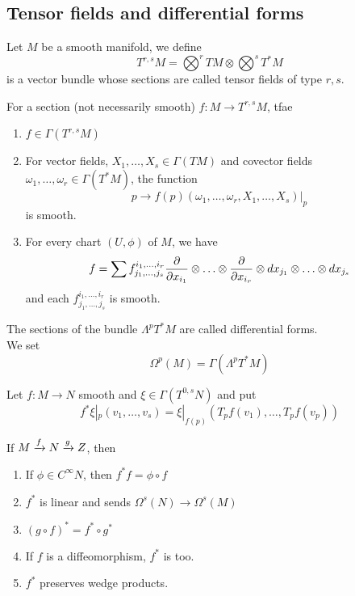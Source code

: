 \documentclass[../main.tex]{subfiles}
\begin{document}
\subsection{Tensor fields and differential forms}
\begin{defn}
	Let $M$ be a smooth manifold, we define
	\[ 
	T^{r,s}M = \bigotimes^{r}TM \otimes \bigotimes^{s}T^{\ast}M
	\]
	is a vector bundle whose sections are called tensor fields of type $r,s$.
\end{defn}
\begin{propo}
For a section (not necessarily smooth)  $f:M\to T^{r,s}M$, tfae
\begin{enumerate}
\item $f\in \Gamma( T^{r,s}M) $ 
\item For vector fields, $X_{1},\ldots, X_s \in \Gamma( TM) $ and covector fields $\omega_1,\ldots,\omega_r\in \Gamma( T^{\ast}M) $, the function
	\[ 
	p \to f( p) ( \omega_1,\ldots,\omega_r, X_1,\ldots,X_s)|_p
	\]
	is smooth.

\item For every chart $( U,\phi) $ of $M$, we have
	\[ 
	f= \sum f_{j_1,\ldots,j_s}^{i_1,\ldots,i_r} \frac{\partial}{\partial x_{i_1} }\otimes\ldots\otimes \frac{\partial}{\partial x_{i_r} } \otimes dx_{j_1} \otimes \ldots\otimes dx_{j_s} 
	\]
	and each $f_{j_1,\ldots,j_s}^{i_1,\ldots,i_r}$ is smooth.
	
\end{enumerate}
\end{propo}
\begin{defn}
	The sections of the bundle $\Lambda^{p}T^{\ast}M$ are called differential forms.\\
	We set
	\[ 
	\Omega^{p}( M) = \Gamma( \Lambda^{p}T^{\ast}M) 
	\]
	
\end{defn}
\begin{defn}[Pullback]
	Let $f:M\to N$ smooth and $\xi \in \Gamma( T^{0,s}N)  $ and put
	\[ 
	f^{\ast}\xi|_p ( v_1,\ldots,v_s) = \xi|_{f( p) } ( T_pf( v_1) ,\ldots, T_pf( v_p) ) 
	\]
\end{defn}
\begin{propo}
If $M\xrightarrow{f} N \xrightarrow{g} Z$, then
\begin{enumerate}
\item If $\phi\in C^{ \infty }N $, then $f^{\ast}f = \phi\circ f$ 
\item $f^{\ast}$ is linear and sends $\Omega^{s }( N) \to \Omega^{s}( M) $ 
\item $( g\circ f  )^{\ast}= f^{\ast}\circ g^{\ast}$ 
\item If $f$ is a diffeomorphism, $f^{\ast}$ is too.
\item $f^{\ast}$ preserves wedge products.
\end{enumerate}
\end{propo}
\end{document}
